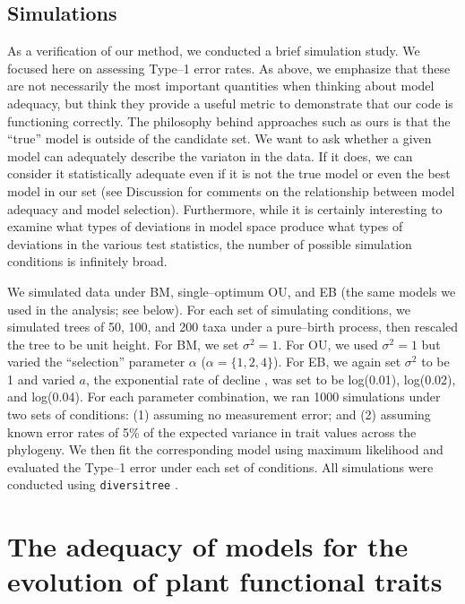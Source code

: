 \documentclass[a4paper,11pt]{article}
\begin{document}
\subsection{Simulations}

As a verification of our method, we conducted a brief simulation study. We focused here on assessing Type--1 error rates. As above, we emphasize that these are not necessarily the most important quantities when thinking about model adequacy, but think they provide a useful metric to demonstrate that our code is functioning correctly. The philosophy behind approaches such as ours is that the ``true'' model is outside of the candidate set. We want to ask whether a given model can adequately describe the variaton in the data. If it does, we can consider it statistically adequate even if it is not the true model or even the best model in our set (see Discussion for comments on the relationship between model adequacy and model selection). Furthermore, while it is certainly interesting to examine what types of deviations in model space produce what types of deviations in the various test statistics, the number of possible simulation conditions is infinitely broad.

We simulated data under BM, single--optimum OU, and EB (the same models we used in the analysis; see below). For each set of simulating conditions, we simulated trees of 50, 100, and 200 taxa under a pure--birth process, then rescaled the tree to be unit height. For BM, we set $\sigma^2=1$. For OU, we used $\sigma^2=1$ but varied the ``selection'' parameter $\alpha$ ($\alpha=\lbrace 1,2,4 \rbrace$). For EB, we again set $\sigma^2$ to be 1 and varied $a$, the exponential rate of decline \citep[see][for details]{Harmon2010, SlaterPennell}, was set to be log(0.01), log(0.02), and log(0.04). For each parameter combination, we ran 1000 simulations under two sets of conditions: (1) assuming no measurement error; and (2) assuming known error rates of 5\% of the expected variance in trait values across the phylogeny. We then fit the corresponding model using maximum likelihood and evaluated the Type--1 error under each set of conditions. All simulations were conducted using \texttt{diversitree} \citep{FitzJohn2012}.


\section{The adequacy of models for the evolution of plant functional traits}
\end{document}
